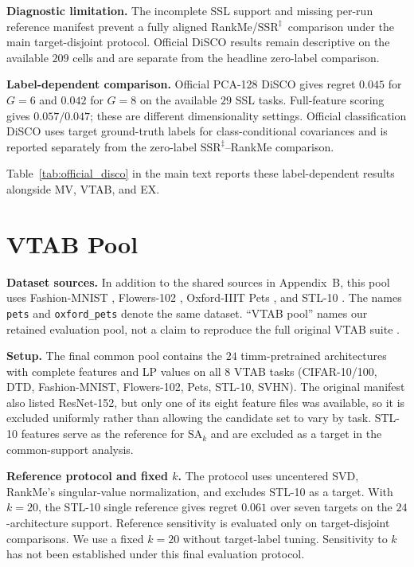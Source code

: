 \documentclass{article}
\newcommand{\SAk}{\ensuremath{\mathrm{SA}_k}\xspace}
\newcommand{\SSRdag}{\ensuremath{\mathrm{SSR}^{\ddagger}}\xspace}
\begin{document}
\textbf{Diagnostic limitation.} The incomplete SSL support and missing per-run reference manifest prevent a fully aligned RankMe/\SSRdag\ comparison under the main target-disjoint protocol. Official DiSCO results remain descriptive on the available $209$ cells and are separate from the headline zero-label comparison.

\textbf{Label-dependent comparison.} Official PCA-128 DiSCO gives regret $0.045$ for $G=6$ and $0.042$ for $G=8$ on the available $29$ SSL tasks. Full-feature scoring gives $0.057/0.047$; these are different dimensionality settings. Official classification DiSCO uses target ground-truth labels for class-conditional covariances and is reported separately from the zero-label \SSRdag--RankMe comparison.

Table~\ref{tab:official_disco} in the main text reports these label-dependent results alongside MV, VTAB, and EX.

\section{VTAB Pool}
\label{app:vtab}

\textbf{Dataset sources.} In addition to the shared sources in Appendix~B, this pool uses Fashion-MNIST \citep{xiao2017fashion}, Flowers-102 \citep{nilsback2008flowers}, Oxford-IIIT Pets \citep{parkhi2012pets}, and STL-10 \citep{coates2011stl10}. The names \texttt{pets} and \texttt{oxford\_pets} denote the same dataset. ``VTAB pool'' names our retained evaluation pool, not a claim to reproduce the full original VTAB suite \citep{zhai2019large}.

\textbf{Setup.}  The final common pool contains the $24$ timm-pretrained architectures with complete features and LP values on all $8$ VTAB tasks (CIFAR-10/100, DTD, Fashion-MNIST, Flowers-102, Pets, STL-10, SVHN). The original manifest also listed ResNet-152, but only one of its eight feature files was available, so it is excluded uniformly rather than allowing the candidate set to vary by task. STL-10 features serve as the reference for $\SAk$ and are excluded as a target in the common-support analysis.

\textbf{Reference protocol and fixed $k$.} The protocol uses uncentered SVD, RankMe's singular-value normalization, and excludes STL-10 as a target. With $k=20$, the STL-10 single reference gives regret $0.061$ over seven targets on the $24$-architecture support. Reference sensitivity is evaluated only on target-disjoint comparisons. We use a fixed $k=20$ without target-label tuning. Sensitivity to $k$ has not been established under this final evaluation protocol.
\end{document}
